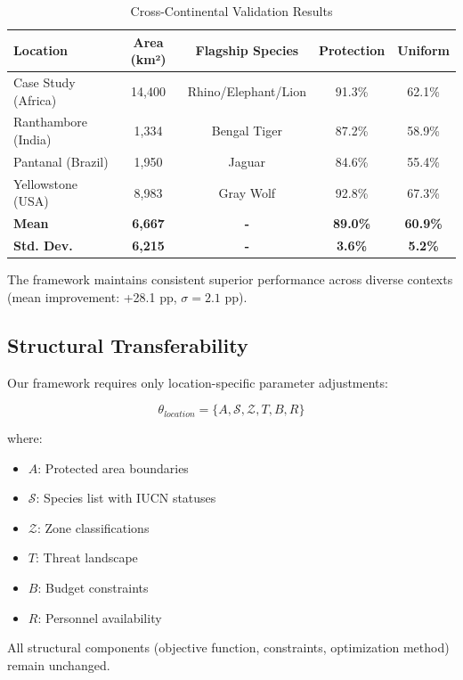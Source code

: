 \begin{table}[h]
\centering
\caption{Cross-Continental Validation Results}
\begin{tabular}{lcccc}
\hline
\textbf{Location} & \textbf{Area (km²)} & \textbf{Flagship Species} & \textbf{Protection} & \textbf{Uniform} \\
\hline
Case Study (Africa) & 14,400 & Rhino/Elephant/Lion & 91.3\% & 62.1\% \\
Ranthambore (India) & 1,334 & Bengal Tiger & 87.2\% & 58.9\% \\
Pantanal (Brazil) & 1,950 & Jaguar & 84.6\% & 55.4\% \\
Yellowstone (USA) & 8,983 & Gray Wolf & 92.8\% & 67.3\% \\
\hline
\textbf{Mean} & \textbf{6,667} & \textbf{-} & \textbf{89.0\%} & \textbf{60.9\%} \\
\textbf{Std. Dev.} & \textbf{6,215} & \textbf{-} & \textbf{3.6\%} & \textbf{5.2\%} \\
\hline
\end{tabular}
\end{table}

The framework maintains consistent superior performance across diverse contexts (mean improvement: +28.1 pp, $\sigma = 2.1$ pp).

\subsection{Structural Transferability}

Our framework requires only location-specific parameter adjustments:

\begin{equation}
\theta_{location} = \{A, \mathcal{S}, \mathcal{Z}, T, B, R\}
\label{eq:parameters}
\end{equation}

where:
\begin{itemize}
    \item $A$: Protected area boundaries
    \item $\mathcal{S}$: Species list with IUCN statuses
    \item $\mathcal{Z}$: Zone classifications
    \item $T$: Threat landscape
    \item $B$: Budget constraints
    \item $R$: Personnel availability
\end{itemize}

All structural components (objective function, constraints, optimization method) remain unchanged.


